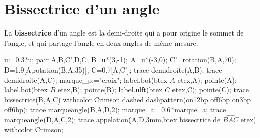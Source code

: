 \section{Bissectrice d'un angle}
\begin{changemargin}{0mm}{-15mm}
    \begin{definition}
        \begin{minipage}{0.6\linewidth}
        La \textbf{bissectrice} d'un angle est la demi-droite qui a pour origine le sommet de l'angle, et qui partage l'angle en deux angles de même mesure.
        \end{minipage}
        \hfill
        \begin{minipage}{0.4\linewidth}
            \begin{Geometrie}[CoinBG={(-4u,-2u)},CoinHD={(4u,4u)}]
                u:=0.3*u;
                pair A,B,C',D,C;
                B=u*(3,-1);
                A=u*(-3,0);
                C'=rotation(B,A,70);
                D=1.9[A,rotation(B,A,35)];
                C=0.7[A,C'];
                trace demidroite(A,B);
                trace demidroite(A,C);
                marque_p:="croix";
                label.bot(btex $A$ etex,A);
                pointe(A);
                label.bot(btex $B$ etex,B);
                pointe(B);
                label.ulft(btex $C$ etex,C);
                pointe(C);
                trace bissectrice(B,A,C) withcolor Crimson dashed dashpattern(on12bp off6bp on3bp off6bp);
                trace marqueangle(B,A,D,2);
                marque_a:=0.6*marque_a;
                trace marqueangle(D,A,C,2);
                trace appelation(A,D,3mm,btex bissectrice de $\widehat{BAC}$ etex) withcolor Crimson;
            \end{Geometrie}
        \end{minipage}
    \end{definition}


\end{changemargin}
